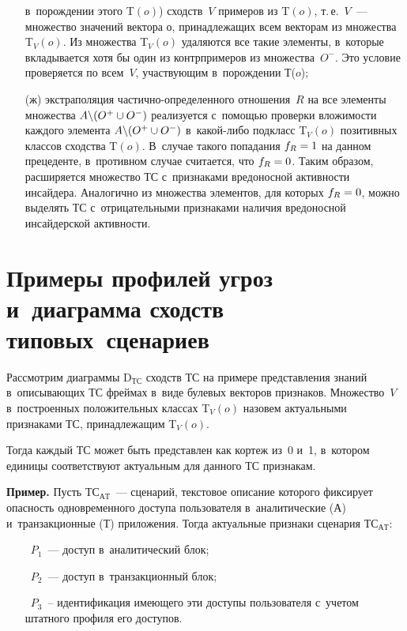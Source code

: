 \begin{multicols}{2}
\begin{itemize}
в~порождении этого T$(o)$) сходств~$V$ примеров из T$(o)$, т.\,е.\ $V$~--- 
множество значений вектора о, принадлежащих всем векторам из множества 
T$_V(o)$. Из множества T$_V(o)$ удаляются все такие элементы, в~которые 
вкладывается хотя бы один из контрпримеров из множества~$O^-$. Это 
условие проверяется по всем~$V$, участвующим в~порождении Т($o$);
\item[(ж)]
экстраполяция час\-тич\-но-опре\-де\-лен\-но\-го отношения~$R$ на все 
элементы множества $A\backslash (O^+\hm \cup O^-)$ реализуется с~помощью 
проверки вло\-жимости каждого элемента $A\backslash (O^+\hm\cup O^-)$ 
в~какой-либо подкласс T$_V(o)$ позитивных классов сходства T$(o)$. 
В~случае такого попадания $f_R\hm=1$ на данном прецеденте, в~противном 
случае считается, что $f_R\hm=0$. Таким образом, расширяется множество 
ТС с~признаками вредоносной активности инсайдера. Аналогично из 
множества элементов, для которых $f_R\hm=0$, можно выделять ТС 
с~отрицательными признаками наличия вредоносной инсайдерской 
активности.
\end{itemize}
  
  \section{Примеры профилей угроз и~диаграмма сходств типовых~сценариев}
   
  Рассмотрим диаграммы D$_{\mathrm{ТС}}$ сходств ТС на примере 
представления знаний в~описывающих ТС фреймах в~виде булевых векторов 
признаков. Множество~$V$ в~построенных положительных классах T$_V(o)$ 
назовем актуальными признаками ТС, принадлежащим T$_V(o)$.
  
  Тогда каждый ТС может быть представлен как кортеж из~0 и~1, в~котором 
единицы соответствуют актуальным для данного ТС признакам.
  
  \smallskip
  
  \noindent
  \textbf{Пример.} Пусть ТС$_{\mathrm{АТ}}$~--- сценарий, текстовое описание 
которого фиксирует опасность одновременного доступа пользователя 
в~аналитические (А) и~транзакционные (Т) приложения. Тогда актуальные 
признаки сценария ТС$_{\mathrm{АТ}}$:
  \begin{itemize}
  \item[\,] $P_1$~--- доступ в~аналитический блок;\\[-9pt] 
  \item[\,] $P_2$~--- доступ в~транзакционный блок;\\[-9pt]
  \item[\,] $P_3$~-- идентификация имеющего эти доступы пользователя 
с~учетом штатного профиля его доступов. 
  \end{itemize}
  

\end{multicols}
